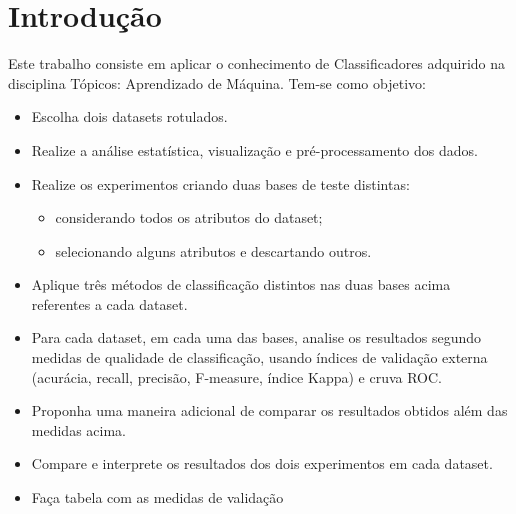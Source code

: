 \chapter{Introdução}\label{cap_intro}

Este trabalho consiste em aplicar o conhecimento de Classificadores adquirido na disciplina Tópicos: Aprendizado de Máquina. Tem-se como objetivo:

\begin{itemize}
\item Escolha dois datasets rotulados.
\item Realize a análise estatística, visualização e pré-processamento dos dados.
\item Realize os experimentos criando duas bases de teste distintas:
\begin{itemize}
\item considerando todos os atributos do dataset;
\item selecionando alguns atributos e descartando outros.
\end{itemize}
\item Aplique três métodos de classificação distintos nas duas bases acima referentes a cada dataset.
\item Para cada dataset, em cada uma das bases, analise os resultados segundo medidas de qualidade de classificação, usando índices de validação externa (acurácia, recall, precisão, F-measure, índice Kappa) e cruva ROC.
\item Proponha uma maneira adicional de comparar os resultados obtidos além das medidas acima.
\item Compare e interprete os resultados dos dois experimentos em cada dataset.
\item Faça tabela com as medidas de validação	
\end{itemize}
